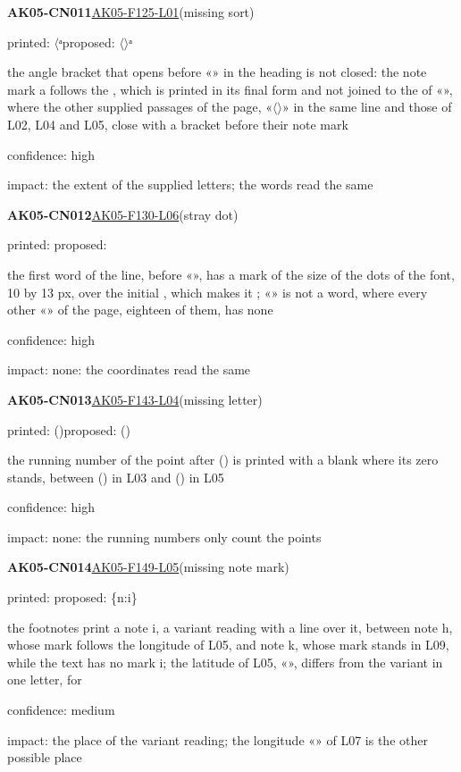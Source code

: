\documentclass[11pt]{article}
\begin{document}
\noindent\textbf{AK05-CN011}\enspace\hyperlink{AK05-F125-L01}{AK05-F125-L01}\enspace(missing sort)\par\noindent printed: \ensuremath{\langle}ᵃ\enspace proposed: \ensuremath{\langle}\ensuremath{\rangle}ᵃ\par\noindent the angle bracket that opens before «» in the heading is not closed: the note mark a follows the , which is printed in its final form and not joined to the  of «», where the other supplied passages of the page, «\ensuremath{\langle}\ensuremath{\rangle}» in the same line and those of L02, L04 and L05, close with a bracket before their note mark\par\noindent confidence: high\par\noindent impact: the extent of the supplied letters; the words read the same\par\medskip
\noindent\textbf{AK05-CN012}\enspace\hyperlink{AK05-F130-L06}{AK05-F130-L06}\enspace(stray dot)\par\noindent printed: \enspace proposed: \par\noindent the first word of the line, before «», has a mark of the size of the dots of the font, 10 by 13 px, over the initial , which makes it ; «» is not a word, where every other «» of the page, eighteen of them, has none\par\noindent confidence: high\par\noindent impact: none: the coordinates read the same\par\medskip
\noindent\textbf{AK05-CN013}\enspace\hyperlink{AK05-F143-L04}{AK05-F143-L04}\enspace(missing letter)\par\noindent printed: ()\enspace proposed: ()\par\noindent the running number of the point after () is printed with a blank where its zero stands, between () in L03 and () in L05\par\noindent confidence: high\par\noindent impact: none: the running numbers only count the points\par\medskip
\noindent\textbf{AK05-CN014}\enspace\hyperlink{AK05-F149-L05}{AK05-F149-L05}\enspace(missing note mark)\par\noindent printed: \enspace proposed: \{n:i\}\par\noindent the footnotes print a note i, a variant reading  with a line over it, between note h, whose mark follows the longitude of L05, and note k, whose mark stands in L09, while the text has no mark i; the latitude of L05, «», differs from the variant in one letter,  for \par\noindent confidence: medium\par\noindent impact: the place of the variant reading; the longitude «» of L07 is the other possible place\par\medskip
\end{document}
